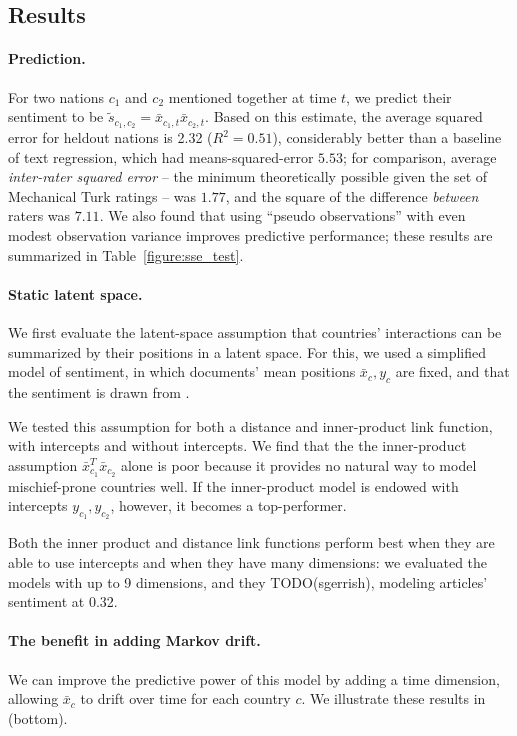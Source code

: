 \subsection{Results}

\paragraph{Prediction.}
For two nations $c_1$ and $c_2$ mentioned together at time $t$, we
predict their sentiment to be $\tilde s_{c_1, c_2} = \bar x_{c_1,t}
\bar x_{c_2, t}$.  Based on this estimate, the average squared error
for heldout nations is 2.32 ($R^2=0.51$), considerably better than a
baseline of text regression, which had means-squared-error $5.53$; for
comparison, average \emph{inter-rater squared error} -- the minimum
theoretically possible given the set of Mechanical Turk ratings -- was
$1.77$, and the square of the difference \emph{between} raters was
$7.11$.  We also found that using ``pseudo observations'' with even
modest observation variance improves predictive performance; these
results are summarized in Table~\ref{figure:sse_test}.

\paragraph{Static latent space.}
We first evaluate the latent-space assumption that countries'
interactions can be summarized by their positions in a latent space.
For this, we used a simplified model of sentiment, in which documents'
mean positions $\bar x_c, y_c$ are fixed, and that the sentiment is
drawn from .

We tested this assumption for both a distance and inner-product link
function, with intercepts and without intercepts.  We find that the
the inner-product assumption $\bar x_{c_1}^T \bar x_{c_2}$ alone is
poor because it provides no natural way to model mischief-prone
countries well.  If the inner-product model is endowed with intercepts
$y_{c_1}, y_{c_2}$, however, it becomes a top-performer.

Both the inner product and distance link functions perform best when
they are able to use intercepts and when they have many dimensions: we
evaluated the models with up to 9 dimensions, and they TODO(sgerrish), modeling articles' sentiment at 0.32.

\paragraph{The benefit in adding Markov drift.}
We can improve the predictive power of this model by adding a time
dimension, allowing $\bar x_c$ to drift over time for each country
$c$.  We illustrate these results in (bottom).

